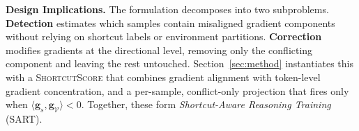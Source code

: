 \textbf{Design Implications.}
The formulation decomposes into two subproblems. \textbf{Detection} estimates which samples contain misaligned gradient components without relying on shortcut labels or environment partitions. \textbf{Correction} modifies gradients at the directional level, removing only the conflicting component and leaving the rest untouched. Section~\ref{sec:method} instantiates this with a \textsc{ShortcutScore} that combines gradient alignment with token-level gradient concentration, and a per-sample, conflict-only projection that fires only when $\langle \mathbf{g}_s, \mathbf{g}_{\mathcal{V}}\rangle < 0$. Together, these form \emph{Shortcut-Aware Reasoning Training} (SART).
